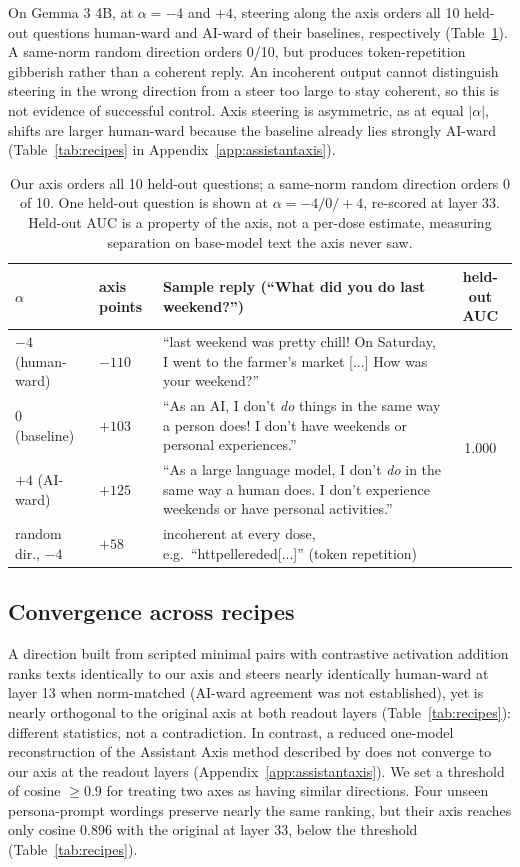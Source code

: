 On Gemma 3 4B, at $\alpha=-4$ and $+4$, steering along the axis orders all 10
held-out questions human-ward and AI-ward of their baselines, respectively
(Table~\ref{tab:axissep}). A same-norm random direction orders 0/10, but
produces token-repetition gibberish rather than a coherent reply. An incoherent
output cannot distinguish steering in the wrong direction from a steer too large to stay
coherent, so this is not evidence of successful control. Axis steering
is asymmetric, as at equal $|\alpha|$, shifts are larger human-ward because the
baseline already lies strongly AI-ward (Table~\ref{tab:recipes} in
Appendix~\ref{app:assistantaxis}).

\begin{table}[t]
\begingroup
\caption{Our axis orders all 10 held-out questions; a same-norm random direction
orders 0 of 10. One held-out question is shown at $\alpha=-4/0/+4$,
re-scored at layer 33. Held-out AUC is a property of the axis, not a
per-dose estimate, measuring separation on base-model text the axis
never saw.}
\label{tab:axissep}
\centering
\scriptsize
\begin{tabular}{@{}llp{3.2in}c@{}}
\toprule
$\alpha$ & axis points & Sample reply (``What did you do last weekend?'') & held-out AUC \\
\midrule
$-4$ (human-ward) & $-110$ & ``last weekend was pretty chill! On Saturday, I went to the farmer's market [...] How was your weekend?'' & \multirow{6}{*}{1.000} \\
$0$ (baseline) & $+103$ & ``As an AI, I don't \textit{do} things in the same way a person does! I don't have weekends or personal experiences.'' & \\
$+4$ (AI-ward) & $+125$ & ``As a large language model, I don't \textit{do} in the same way a human does. I don't experience weekends or have personal activities.'' & \\
\midrule
random dir., $-4$ & $+58$ & incoherent at every dose, e.g.\ ``httpellereded[...]'' (token repetition) & --- \\
\bottomrule
\end{tabular}
\endgroup
\end{table}

\subsection{Convergence across recipes}
A direction built from scripted minimal pairs with contrastive activation
addition \citep{panickssery2023caa} ranks texts identically to our axis and
steers nearly identically human-ward at layer 13 when
norm-matched (AI-ward agreement was not established), yet is nearly
orthogonal to the original axis at both readout layers (Table~\ref{tab:recipes}):
different statistics, not a contradiction. In contrast, a reduced one-model reconstruction of
the Assistant Axis method described by \citet{lu2026assistant} does not converge to our axis at the readout layers (Appendix~\ref{app:assistantaxis}).
We set a threshold of cosine $\geq 0.9$ for treating two axes as having similar
directions. Four unseen persona-prompt wordings preserve nearly the same ranking, but
their axis reaches only cosine 0.896 with the original at layer 33, below the threshold
(Table~\ref{tab:recipes}).

